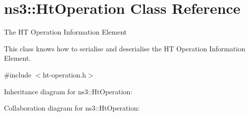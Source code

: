 \hypertarget{classns3_1_1HtOperation}{}\section{ns3\+:\+:Ht\+Operation Class Reference}
\label{classns3_1_1HtOperation}


The HT Operation Information Element

This class knows how to serialise and deserialise the HT Operation Information Element.  




{\ttfamily \#include $<$ht-\/operation.\+h$>$}



Inheritance diagram for ns3\+:\+:Ht\+Operation\+:


Collaboration diagram for ns3\+:\+:Ht\+Operation\+:
